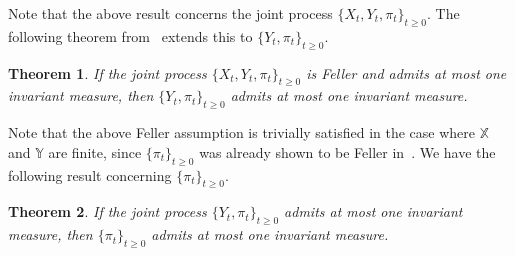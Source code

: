 \documentclass{article}
\newtheorem{theorem}{Theorem}[section]
\begin{document}
Note that the above result concerns the joint process \( \{X_t,Y_t,\pi_t \}_{t\ge0} \). The following theorem from~\cite{Stettner} extends this to \( \{Y_t,\pi_t \}_{t\ge0} \).

\begin{theorem}\cite[Theorem 3]{Stettner}
    If the joint process \( \{X_t,Y_t,\pi_t \}_{t\ge0} \) is Feller and admits at most one invariant measure, then \( \{Y_t, \pi_t\}_{t\ge0} \) admits at most one invariant measure.
\end{theorem}

Note that the above Feller assumption is trivially satisfied in the case where \( \mathbb{X} \) and \( \mathbb{Y} \) are finite, since \( \{\pi_t\}_{t\ge0} \) was already shown to be Feller in~\cite{Linder}. We have the following result concerning \( \{\pi_t\}_{t\ge0} \).

\begin{theorem}
    If the joint process \( \{Y_t, \pi_t\}_{t\ge0} \) admits at most one invariant measure, then \( \{\pi_t\}_{t\ge0} \) admits at most one invariant measure.
\end{theorem}
\end{document}
